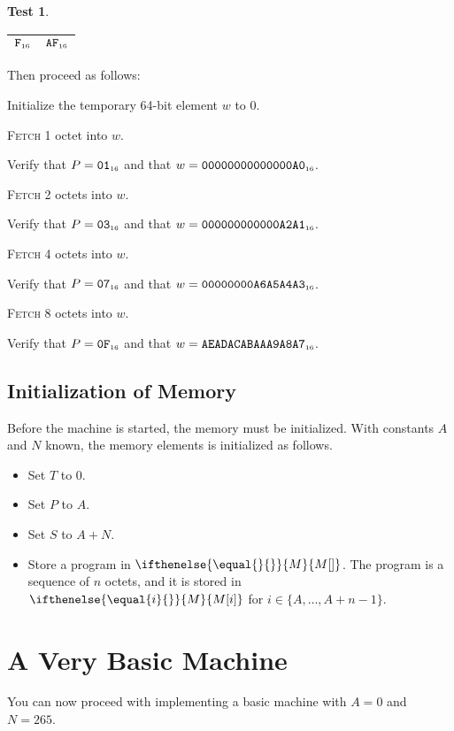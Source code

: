 \documentclass[a4paper,12pt]{article}
\makeatletter
\newcommand{\num}[1]{\texttt{#1}}
\newcommand{\hex}[1]{\num{#1}_{\textup{\tiny 16}}}
\newcommand{\MEM}[1]{\ifthenelse{\equal{#1}{}}{M}{M[#1]}}
\newcommand{\PC}{P}
\newcommand{\SP}{S}
\newcommand{\TERM}{T}
\newcommand{\range}[2]{\{#1,\ldots,#2\}}
\newcommand{\proc}[1]{\textsc{#1}}
\theoremstyle{definition}
\newtheorem{test}{Test}
\newenvironment{memtable}{%
  \begin{trivlist}
    \item
    }{%
    \end{trivlist}}
\newenvironment{memcolumn}{%
  \begin{tabular}{@{}ll@{}}
    \hline}
    {%
    \hline
  \end{tabular}}
\makeatother
\begin{document}
\begin{test}
\begin{memtable}
\begin{memcolumn}
      $\hex{F}$ & $\hex{AF}$ \\
    \end{memcolumn}
  \end{memtable}
  Then proceed as follows:
  \begin{stepnumbers}
  \item Initialize the temporary 64-bit element $w$ to 0.
  \item \proc{Fetch} 1 octet into $w$.
  \item Verify that $\PC = \hex{01}$ and that $w = \hex{00000000000000A0}$.
  \item \proc{Fetch} 2 octets into $w$.
  \item Verify that $\PC = \hex{03}$ and that $w = \hex{000000000000A2A1}$.
  \item \proc{Fetch} 4 octets into $w$.
  \item Verify that $\PC = \hex{07}$ and that $w = \hex{00000000A6A5A4A3}$.
  \item \proc{Fetch} 8 octets into $w$.
  \item Verify that $\PC = \hex{0F}$ and that $w = \hex{AEADACABAAA9A8A7}$.
  \end{stepnumbers}
\end{test}

\subsection{Initialization of Memory}
\label{sec:initialization-of-memory}

Before the machine is started, the memory must be initialized.
With constants $A$ and $N$ known, the memory elements is initialized as follows.
\begin{itemize}
\item Set $\TERM$ to 0.
\item Set $\PC$ to $A$.
\item Set $\SP$ to $A+N$.
\item Store a program in $\MEM{}$.
  The program is a sequence of $n$ octets, and it is stored in $\MEM{i}$ for $i \in \range{A}{A+n-1}$.
\end{itemize}

\section{A Very Basic Machine}

You can now proceed with implementing a basic machine with $A=0$ and $N=265$.
\end{document}

